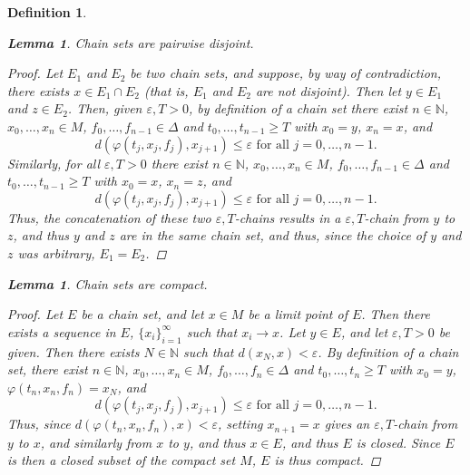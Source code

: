 \documentclass[11pt]{article}
\newtheorem{defn}[thm]{Definition}
\newtheorem{lem}[thm]{Lemma}
\begin{document}
\begin{defn}
\begin{lem}\label{chaindisjoint}
Chain sets are pairwise disjoint.
\end{lem}
\begin{proof}
Let $E_1$ and $E_2$ be two chain sets, and suppose, by way of contradiction, there exists $x\in E_1\cap E_2$ (that is, $E_1$ and $E_2$ are not disjoint).  Then let $y\in E_1$ and $z\in E_2$.  Then, given $\varepsilon, T>0$, by definition of a chain set there exist $n\in\mathbb{N}$, $x_0,\ldots,x_n\in M$, $f_0,\ldots,f_{n-1}\in\Delta$ and $t_0,\ldots,t_{n-1}\geq T$ with $x_0=y$, $x_n=x$, and 
$$d(\varphi(t_j,x_j,f_j),x_{j+1})\leq\varepsilon\mbox{ for all }j=0,\ldots,n-1.$$  Similarly, for all $\varepsilon, T>0$ there exist $n\in\mathbb{N}$, $x_0,\ldots,x_n\in M$, $f_0,\ldots,f_{n-1}\in\Delta$ and $t_0,\ldots,t_{n-1}\geq T$ with $x_0=x$, $x_n=z$, and 
$$d(\varphi(t_j,x_j,f_j),x_{j+1})\leq\varepsilon\mbox{ for all }j=0,\ldots,n-1.$$
Thus, the concatenation of these two $\varepsilon, T$-chains results in a $\varepsilon, T$-chain from $y$ to $z$, and thus $y$ and $z$ are in the same chain set, and thus, since the choice of $y$ and $z$ was arbitrary, $E_1=E_2$.  
\end{proof}

\begin{lem}  \label{compact}
Chain sets are compact.
\end{lem}
\begin{proof}
Let $E$ be a chain set, and let $x\in M$ be a limit point of $E$.  Then there exists a sequence in $E$, $\{x_i\}_{i=1}^\infty$ such that $x_i\rightarrow x$.  Let $y\in E$, and let $\varepsilon, T>0$ be given.  Then there exists $N\in\mathbb{N}$ such that $d(x_N,x)<\varepsilon$.  By definition of a chain set, there exist $n\in\mathbb{N}$, $x_0,\ldots,x_n\in M$, $f_0,\ldots,f_{n}\in\Delta$ and $t_0,\ldots,t_{n}\geq T$ with $x_0=y$, $\varphi(t_n,x_n,f_n)=x_N$, and 
$$d(\varphi(t_j,x_j,f_j),x_{j+1})\leq\varepsilon\mbox{ for all }j=0,\ldots,n-1.$$  
Thus, since $d(\varphi(t_n,x_n,f_n),x)<\varepsilon$, setting $x_{n+1}=x$ gives an $\varepsilon, T$-chain from $y$ to $x$, and similarly from $x$ to $y$, and thus $x\in E$, and thus $E$ is closed.  Since $E$ is then a closed subset of the compact set $M$, $E$ is thus compact. 
\end{proof}


\end{defn}
\end{document}

